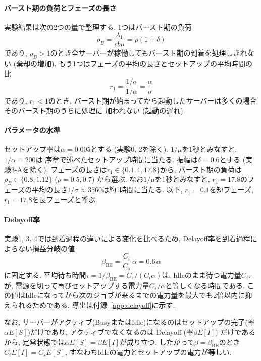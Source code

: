 \documentclass[a4paper, 11pt, dvipdfmx]{jsreport}
\begin{document}
\paragraph{バースト期の負荷とフェーズの長さ}
実験結果は次の2つの量で整理する. 1つはバースト期の負荷
\begin{equation}
    \rho_B = \frac{\lambda_1}{c b \mu} = \rho(1+\delta)
    \label{eq:rho-burst}
\end{equation}
であり, $\rho_B > 1$のとき全サーバーが稼働してもバースト期の到着を処理しきれない (棄却の増加).
もう1つはフェーズの平均の長さとセットアップの平均時間の比
\begin{equation}
    r_1 = \frac{1/\sigma}{1/\alpha} = \frac{\alpha}{\sigma}
    \label{eq:r1}
\end{equation}
であり, $r_1 < 1$のとき, バースト期が始まってから起動したサーバーは多くの場合そのバースト期のうちに処理に
加われない (起動の遅れ).

\paragraph{パラメータの水準}
セットアップ率は$\alpha = 0.005$とする (実験0, 2を除く). $1/\mu$を1秒とみなすと, $1/\alpha = 200$は
序章で述べたセットアップ時間に当たる. 振幅は$\delta = 0.6$とする (実験3-Aを除く). フェーズの長さは$r_1 \in \{0.1, 1, 17.8\}$から,
バースト期の負荷は$\rho_B \in \{0.8, 1.12\}$ ($\rho = 0.5, 0.7$) から選ぶ.
なお$1/\mu$を1秒とみなすと, $r_1 = 17.8$のフェーズの平均の長さ$1/\sigma \approx 3560$は約1時間に当たる.
以下, $r_1 = 0.1$を短フェーズ, $r_1 = 17.8$を長フェーズと呼ぶ.

\paragraph{Delayoff率}
実験1, 3, 4では到着過程の違いによる変化を比べるため, Delayoff率を到着過程によらない損益分岐の値
\begin{equation}
    \beta_{\mathrm{BE}} = \frac{C_i}{C_s}\, \alpha = 0.6\, \alpha
    \label{eq:beta-be}
\end{equation}
に固定する. 平均待ち時間$\tau = 1/\beta_{\mathrm{BE}} = C_s / (C_i \alpha)$は, Idleのまま待つ電力量$C_i \tau$が,
電源を切って再びセットアップする電力量$C_s / \alpha$と等しくなる時間である.
この値はIdleになってから次のジョブが来るまでの電力量を最大でも$2$倍以内に抑えられるためである.
導出は付録~\ref{app:delayoff}に示す.

なお, サーバーがアクティブ(BusyまたはIdle)になるのはセットアップの完了(率$\alpha E[S]$)だけであり, アクティブでなくなるのは
Delayoff (率$\beta E[I]$) だけであるから, 定常状態では$\alpha E[S] = \beta E[I]$が成り立つ.
したがって$\beta = \beta_{\mathrm{BE}}$のとき$C_i E[I] = C_s E[S]$, すなわちIdleの電力とセットアップの電力が等しい.
\end{document}

